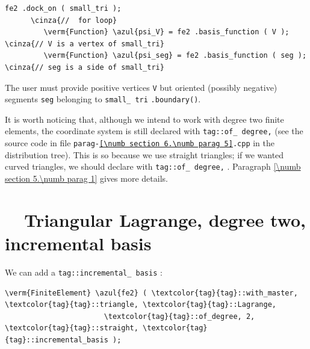 \begin{Verbatim}[commandchars=\\\{\},formatcom=\small\tt,frame=single,
   label=parag-\ref{\numb section 6.\numb parag 5}.cpp,rulecolor=\color{coment},
   baselinestretch=0.94,framesep=2mm                                            ]
      fe2 .dock_on ( small_tri );
      \cinza{//  for loop}  
         \verm{Function} \azul{psi_V} = fe2 .basis_function ( V );   \cinza{// V is a vertex of small_tri}
         \verm{Function} \azul{psi_seg} = fe2 .basis_function ( seg );  \cinza{// seg is a side of small_tri}
\end{Verbatim}

The user must provide positive vertices {\small\tt V} but oriented (possibly negative) segments
{\small\tt seg} belonging to {\small\tt small\_\,tri} {\small\tt .boundary()}.

It is worth noticing that, although we intend to work with degree two finite elements,
the coordinate system {\small\tt{}} is still declared with
{\small\tt\textcolor{tag}{tag}::of\_\,degree,} {\small\tt{}}
(see the source code in file {\small\tt parag-\ref{\numb section 6.\numb parag 5}.cpp}
in the distribution tree).
This is so because we use straight triangles; if we wanted curved triangles, we should
declare {\small\tt{}} with {\small\tt\textcolor{tag}{tag}::of\_\,degree,}
{\small\tt{}}.
Paragraph \ref{\numb section 5.\numb parag 1} gives more details.


\section{~~Triangular Lagrange, degree two, incremental basis}
\label{\numb section 6.\numb parag 6}

We can add a {\small\tt\textcolor{tag}{tag}::incremental\_\,basis} :

\begin{Verbatim}[commandchars=\\\{\},formatcom=\small\tt,frame=single,
   label=parag-\ref{\numb section 6.\numb parag 6}.cpp,rulecolor=\color{coment},
   baselinestretch=0.94,framesep=2mm                                            ]
   \verm{FiniteElement} \azul{fe2} ( \textcolor{tag}{tag}::with_master, \textcolor{tag}{tag}::triangle, \textcolor{tag}{tag}::Lagrange,
                       \textcolor{tag}{tag}::of_degree, 2, \textcolor{tag}{tag}::straight, \textcolor{tag}{tag}::incremental_basis );
\end{Verbatim}

